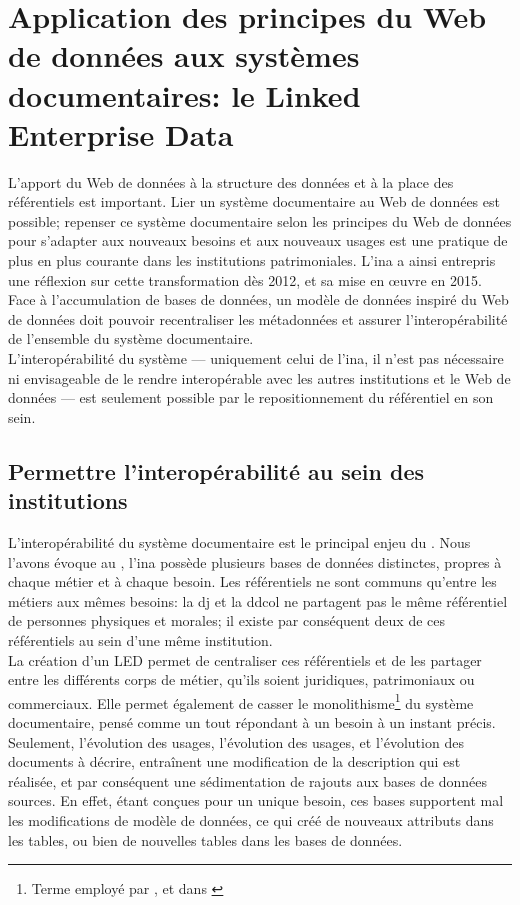 \section{\label{III-B-1}Application des principes du Web de données aux systèmes documentaires: le Linked Enterprise Data}

L'apport du Web de données à la structure des données et à la place des référentiels est important. Lier un système documentaire au Web de données est possible; repenser ce système documentaire selon les principes du Web de données pour s'adapter aux nouveaux besoins et aux nouveaux usages est une pratique de plus en plus courante dans les institutions patrimoniales. L'\ac{ina} a ainsi entrepris une réflexion sur cette transformation dès 2012, et sa mise en œuvre en 2015. Face à l'accumulation de bases de données, un modèle de données inspiré du Web de données doit pouvoir recentraliser les métadonnées et assurer l'interopérabilité de l'ensemble du système documentaire.\\

L'interopérabilité du système --- uniquement celui de l'\ac{ina}, il n'est pas nécessaire ni envisageable de le rendre interopérable avec les autres institutions et le Web de données --- est seulement possible par le repositionnement du référentiel en son sein.

\subsection{\label{III-B-1-a}Permettre l'interopérabilité au sein des institutions}

L'interopérabilité du système documentaire est le principal enjeu du \ldd. Nous l'avons évoque au , l'\ac{ina} possède plusieurs bases de données distinctes, propres à chaque métier et à chaque besoin. Les référentiels ne sont communs qu'entre les métiers aux mêmes besoins: la \ac{dj} et la \ac{ddcol} ne partagent pas le même référentiel de personnes physiques et morales; il existe par conséquent deux de ces référentiels au sein d'une même institution.\\

La création d'un LED permet de centraliser ces référentiels et de les partager entre les différents corps de métier, qu'ils soient juridiques, patrimoniaux ou commerciaux. Elle permet également de casser le monolithisme\footnote{Terme employé par ,  et  dans \cite{bermes_cas_2013}} du système documentaire, pensé comme un tout répondant à un besoin à un instant précis. Seulement, l'évolution des usages, l'évolution des usages, et l'évolution des documents à décrire, entraînent une modification de la description qui est réalisée, et par conséquent une sédimentation de rajouts aux bases de données sources. En effet, étant conçues pour un unique besoin, ces bases supportent mal les modifications de modèle de données, ce qui créé de nouveaux attributs dans les tables, ou bien de nouvelles tables dans les bases de données.\\

